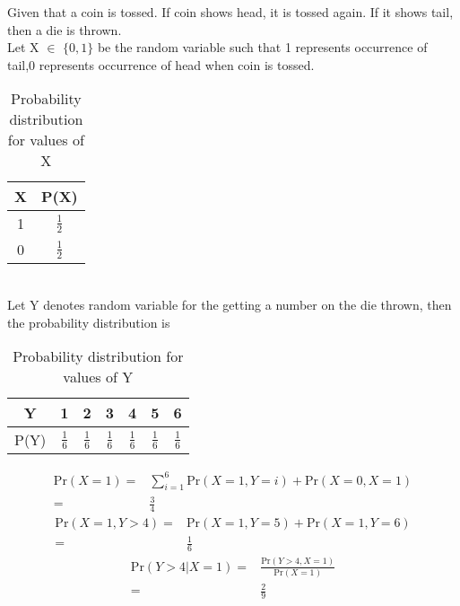 Given that a coin is tossed. If coin shows head, it is tossed again. If it shows tail, then a die is thrown.
\\Let X $\in$ $\{0,1\}$ be the random variable such that 1 represents occurrence of tail,0 represents occurrence of head when coin is tossed.
\begin{table}[ht]
\caption{Probability distribution for values of X}
\begin{center}
    \begin{tabular}{|c|c|}
    \hline
    X & P(X)\\
    \hline
    1 & $\frac{1}{2}$ \\
    \hline
    0 & $\frac{1}{2}$\\
    \hline
    \end{tabular}
\end{center} 
\end{table}
\\Let Y denotes random variable for the getting a number on the die thrown, then the probability distribution is
\begin{table}[ht]
\caption{Probability distribution for values of Y}
\begin{center}
    \begin{tabular}{|c|c|c|c|c|c|c|}
    \hline
    Y & 1 & 2 & 3 & 4 & 5 & 6 \\
    \hline
    P(Y) & $\frac{1}{6}$ & $\frac{1}{6}$ & $\frac{1}{6}$ & $\frac{1}{6}$ & $\frac{1}{6}$ & $\frac{1}{6}$  \\
    \hline
    \end{tabular}
\end{center} 
\end{table}
\begin{align}
  \text{Pr}(X=1)
=& \sum_{i=1}^{6}\text{Pr}(X=1,Y=i)+\text{Pr}(X=0,X=1)\\
=&\frac{3}{4}
\end{align}
\begin{align}
 \text{Pr}(X=1,Y>4)
=&\text{Pr}(X=1,Y=5)+\text{Pr}(X=1,Y=6)\\
=&\frac{1}{6}  
\end{align}
\begin{align}
\text{Pr}(Y>4|X=1)= &\frac{\text{Pr}(Y>4,X=1)}{\text{Pr}(X=1)}\\
 = &\frac{2}{9}
\end{align}
